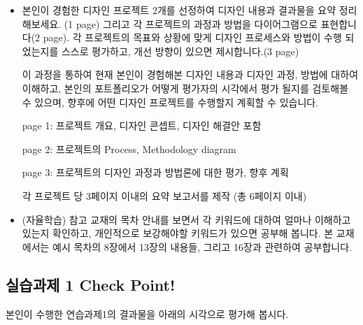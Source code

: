 \documentclass[
  letterpaper,
  DIV=11,
  numbers=noendperiod]{scrreprt}
\begin{document}
\begin{itemize}
\item
  본인이 경험한 디자인 프로젝트 2개를 선정하여 디자인 내용과 결과물을
  요약 정리해보세요. (1 page) 그리고 각 프로젝트의 과정과 방법을
  다이어그램으로 표현합니다(2 page). 각 프로젝트의 목표와 상황에 맞게
  디자인 프로세스와 방법이 수행 되었는지를 스스로 평가하고, 개선 방향이
  있으면 제시합니다.(3 page)

  이 과정을 통하여 현재 본인이 경험해본 디자인 내용과 디자인 과정,
  방법에 대하여 이해하고, 본인의 포트폴리오가 어떻게 평가자의 시각에서
  평가 될지를 검토해볼 수 있으며, 향후에 어떤 디자인 프로젝트를 수행할지
  계획할 수 있습니다.

  page 1: 프로젝트 개요, 디자인 콘셉트, 디자인 해결안 포함

  page 2: 프로젝트의 Process, Methodology diagram

  page 3: 프로젝트의 디자인 과정과 방법론에 대한 평가, 향후 계획

  각 프로젝트 당 3페이지 이내의 요약 보고서를 제작 (총 6페이지 이내)
\item
  (자율학습) 참고 교재의 목차 안내를 보면서 각 키워드에 대하여 얼마나
  이해하고 있는지 확인하고, 개인적으로 보강해야할 키워드가 있으면 공부해
  봅니다. 본 교재에서는 예시 목차의 8장에서 13장의 내용들, 그리고 16장과
  관련하여 공부합니다.
\end{itemize}

\subsection{실습과제 1 Check
Point!}\label{uxc2e4uxc2b5uxacfcuxc81c-1-check-point}

본인이 수행한 연습과제1의 결과물을 아래의 시각으로 평가해 봅시다.
\end{document}
